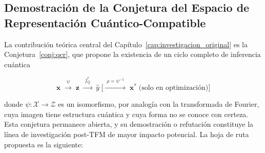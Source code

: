 \subsection{Demostración de la Conjetura del Espacio de Representación Cuántico-Compatible}
\label{sec:futuro_conjetura_qcr}

La contribución teórica central del Capítulo~\ref{cap:investigacion_original} es la Conjetura~\ref{conj:qcr}, que propone la existencia de un ciclo completo de inferencia cuántica

\begin{equation}
  \mathbf{x}
  \;\xrightarrow{\;\psi\;}\;
  \mathbf{z}
  \;\xrightarrow{\;f_Q^*\;}\;
  \hat{y}
  \;\Big[\xrightarrow{\;\rho=\psi^{-1}\;}\; \mathbf{x}^* \;\text{(solo en optimización)}\Big]
\end{equation}

donde $\psi: \mathcal{X} \rightarrow \mathcal{Z}$ es un isomorfismo, por analogía con la transformada de Fourier, cuya imagen tiene estructura cuántica y cuya forma no se conoce con certeza. Esta conjetura permanece abierta, y su demostración o refutación constituye la línea de investigación post-TFM de mayor impacto potencial. La hoja de ruta propuesta es la siguiente:

